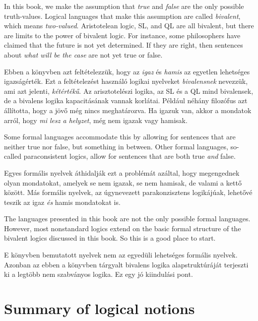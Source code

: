 In this book, we make the assumption that \emph{true} and \emph{false} are the only possible truth-values. Logical languages that make this assumption are called \emph{bivalent}, which means \emph{two-valued}. Aristotelean logic, SL, and QL are all bivalent, but there are limits to the power of bivalent logic. For instance, some philosophers have claimed that the future is not yet determined. If they are right, then sentences about \emph{what will be the case} are not yet true or false.

Ebben a könyvben azt feltételezzük, hogy az \emph{igaz} és \emph{hamis} az egyetlen lehetséges igazságérték. Ezt a feltételezést használó logikai nyelveket \emph{bivalensnek} nevezzük, ami azt jelenti, \emph{kétértékű}. Az arisztotelészi logika, az SL és a QL mind bivalensek, de a bivalens logika kapacitásának vannak korlátai. Például néhány filozófus azt állította, hogy a jövő még nincs meghatározva. Ha igazuk van, akkor a mondatok arról, hogy \emph{mi lesz a helyzet}, még nem igazak vagy hamisak. 

Some formal languages accommodate this by allowing for sentences that are neither true nor false, but something in between.
Other formal languages, so-called paraconsistent logics, allow for sentences that are both true \emph{and} false.

Egyes formális nyelvek áthidalják ezt a problémát azáltal, hogy megengednek olyan mondatokat, amelyek se nem igazak, se nem hamisak, de valami a kettő között. 
Más formális nyelvek, az úgynevezett parakonzisztens logikájúak, lehetővé teszik az igaz \emph{és} hamis mondatokat is.

The languages presented in this book are not the only possible formal languages. However, most nonstandard logics extend on the basic formal structure of the bivalent logics discussed in this book. So this is a good place to start.

E könyvben bemutatott nyelvek nem az egyedüli lehetséges formális nyelvek. Azonban az ebben a könyvben tárgyalt bivalens logika alapstruktúráját terjeszti ki a legtöbb nem szabványos logika. Ez egy jó kiindulási pont.

\section*{Summary of logical notions}
